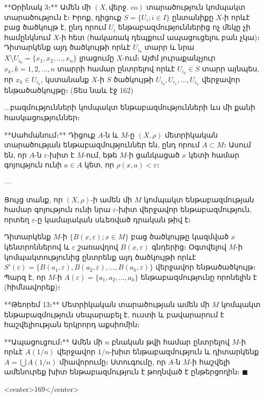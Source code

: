 **Օրինակ 3։** Ամեն մի $(X, \text{վերջ. co})$ տարածություն կոմպակտ տարածություն է։ Իրոք, դիցուք $S = \{U_i; i \in I\}$ ընտանիքը $X$-ի որևէ բաց ծածկույթ է, ընդ որում $U_i$ ենթաբազմություններից ոչ մեկը չի համընկնում $X$-ի հետ (հակառակ դեպքում ապացուցելու բան չկա)։ Դիտարկենք այդ ծածկույթի որևէ $U_{i_0}$ տարր և նրա $X \setminus U_{i_0} = \{x_1, x_2, \dots, x_n\}$ լրացումը $X$-ում։ Այժմ յուրաքանչյուր $x_k, k=1, 2, \dots, n$ տարրի համար ընտրելով որևէ $U_{i_k} \in S$ տարր այնպես, որ $x_k \in U_{i_k}$, կստանանք $X$-ի $S$ ծածկույթի $U_{i_0}, U_{i_1}, \dots, U_{i_n}$ վերջավոր ենթածածկույթը։ (Տես նաև էջ 162)

...բազմությունների կոմպակտ ենթաբազմությունների ևս մի քանի հասկացություններ։

**Սահմանում։** Դիցուք $A$-ն և $M$-ը $(X, \rho)$ մետրիկական տարածության ենթաբազմություններ են, ընդ որում $A \subset M$։ Ասում են, որ $A$-ն $\varepsilon$-խիտ է $M$-ում, եթե $M$-ի ցանկացած $x$ կետի համար գոյություն ունի $a \in A$ կետ, որ $\rho(x, a) < \varepsilon$։

---

Ցույց տանք, որ $(X, \rho)$-ի ամեն մի $M$ կոմպակտ ենթաբազմության համար գոյություն ունի նրա $\varepsilon$-խիտ վերջավոր ենթաբազմություն, որտեղ $\varepsilon$-ը կամայական սևեռված դրական թիվ է։

Դիտարկենք $M$-ի $\{B(x, \varepsilon); x \in M\}$ բաց ծածկույթը կազմված $x$ կենտրոններով և $\varepsilon$ շառավղով $B(x, \varepsilon)$ գնդերից։ Օգտվելով $M$-ի կոմպակտությունից ընտրենք այդ ծածկույթի որևէ $S'(\varepsilon) = \{B(a_1, \varepsilon), B(a_2, \varepsilon), \dots, B(a_k, \varepsilon)\}$ վերջավոր ենթածածկույթ։ Պարզ է, որ $M$-ի $A(\varepsilon) = \{a_1, a_2, \dots, a_k\}$ ենթաբազմությունը որոնելին է (հիմնավորեք)։

**Թեորեմ 13։** Մետրիկական տարածության ամեն մի $M$ կոմպակտ ենթաբազմություն սեպարաբել է, ուստի և բավարարում է հաշվելիության երկրորդ աքսիոմին։

**Ապացուցում։** Ամեն մի $n$ բնական թվի համար ընտրելով $M$-ի որևէ $A(1/n)$ վերջավոր $1/n$-խիտ ենթաբազմություն և դիտարկենք $A = \bigcup A(1/n)$ միավորումը։ Ստուգումը, որ $A$-ն $M$-ի հաշվելի ամենուրեք խիտ ենթաբազմություն է թողնված է ընթերցողին։ $\blacksquare$

<center>169</center>